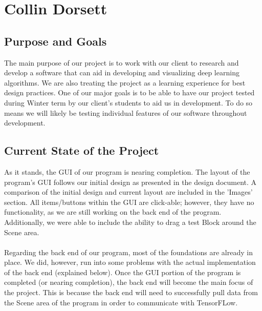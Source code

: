 \documentclass[journal,10pt,onecolumn,compsoc]{IEEEtran} \usepackage[margin=1.0in]{geometry} \usepackage{pdfpages}
\begin{document}
\section{Collin Dorsett}
\subsection{Purpose and Goals}
\noindent The main purpose of our project is to work with our client to research and develop a software that can aid in developing and visualizing deep learning algorithms. We are also treating the project as a learning experience for best design practices. One of our major goals is to be able to have our project tested during Winter term by our client's students to aid us in development. To do so means we will likely be testing individual features of our software throughout development.
\subsection{Current State of the Project}
\noindent As it stands, the GUI of our program is nearing completion. The layout of the program's GUI follows our initial design as presented in the design document. A comparison of the initial design and current layout are included in the 'Images' section. All items/buttons within the GUI are click-able; however, they have no functionality, as we are still working on the back end of the program. Additionally, we were able to include the ability to drag a test Block around the Scene area.\\\\
\noindent Regarding the back end of our program, most of the foundations are already in place. We did, however, run into some problems with the actual implementation of the back end (explained below). Once the GUI portion of the program is completed (or nearing completion), the back end will become the main focus of the project. This is because the back end will need to successfully pull data from the Scene area of the program in order to communicate with TensorFLow\texttrademark.
\end{document}
